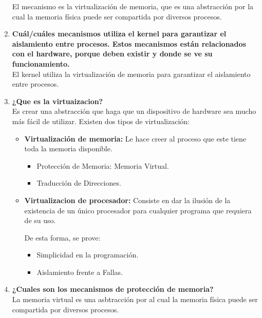 \documentclass[../main.tex]{subfiles}
\begin{document}
\begin{enumerate}
                El mecanismo es la virtualización de memoria, que es una abstracción por la cual la memoria física puede ser compartida por diversos procesos.
            \item 
                \textbf{Cuál/cuáles mecanismos utiliza el kernel para garantizar el aislamiento entre procesos. Estos mecanismos están relacionados con el hardware, porque deben existir y donde se ve su funcionamiento.}\\
                El kernel utiliza la virtualización de memoria para garantizar el aislamiento entre procesos.
            \item 
                \textbf{¿Que es la virtuaizacion?}\\
                Es crear una abstracción que haga que un dispositivo de hardware sea mucho más fácil de utilizar.
                Existen dos tipos de virtualización:
                \begin{itemize}
                    \item \textbf{Virtualización de memoria:} Le hace creer al proceso que este tiene toda la memoria disponible.
                        \begin{itemize}
                            \item Protección de Memoria: Memoria Virtual.
                            \item Traducción de Direcciones.
                        \end{itemize} 
                    \item \textbf{Virtualizacion de procesador:} Consiste en dar la ilusión de la existencia de un único procesador para cualquier programa que requiera de su uso.
                    
                    De esta forma, se prove:
                    \begin{itemize}
                        \item Simplicidad en la programación.
                        \item Aislamiento frente a Fallas.
                    \end{itemize}
                \end{itemize}
            \item 
                \textbf{¿Cuales son los mecanismos de protección de memoria?}\\
                La memoria virtual es una asbtracción por al cual la memoria física puede ser compartida por diversos procesos.


\end{enumerate}
\end{document}
